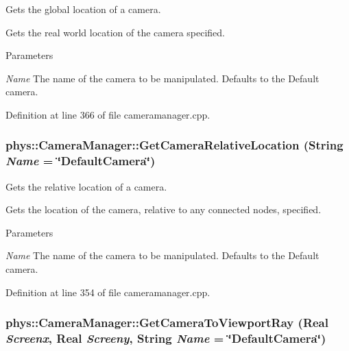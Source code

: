 Gets the global location of a camera. 

Gets the real world location of the camera specified. 
\begin{DoxyParams}{Parameters}
\item[{\em Name}]The name of the camera to be manipulated. Defaults to the Default camera. \end{DoxyParams}


Definition at line 366 of file cameramanager.cpp.

\hypertarget{classphys_1_1CameraManager_a8557218460fbc94a029f74945fa2517c}{
\subsubsection[{GetCameraRelativeLocation}]{ phys::CameraManager::GetCameraRelativeLocation ({\bf String} {\em Name} = {\ttfamily \char`\"{}DefaultCamera\char`\"{}})}}
\label{d9/d91/classphys_1_1CameraManager_a8557218460fbc94a029f74945fa2517c}


Gets the relative location of a camera. 

Gets the location of the camera, relative to any connected nodes, specified. 
\begin{DoxyParams}{Parameters}
\item[{\em Name}]The name of the camera to be manipulated. Defaults to the Default camera. \end{DoxyParams}


Definition at line 354 of file cameramanager.cpp.

\hypertarget{classphys_1_1CameraManager_a1a631eee22a0e45e2e72727d0bcc3560}{
\subsubsection[{GetCameraToViewportRay}]{ phys::CameraManager::GetCameraToViewportRay ({\bf Real} {\em Screenx}, \/  {\bf Real} {\em Screeny}, \/  {\bf String} {\em Name} = {\ttfamily \char`\"{}DefaultCamera\char`\"{}})}}
\label{d9/d91/classphys_1_1CameraManager_a1a631eee22a0e45e2e72727d0bcc3560}


